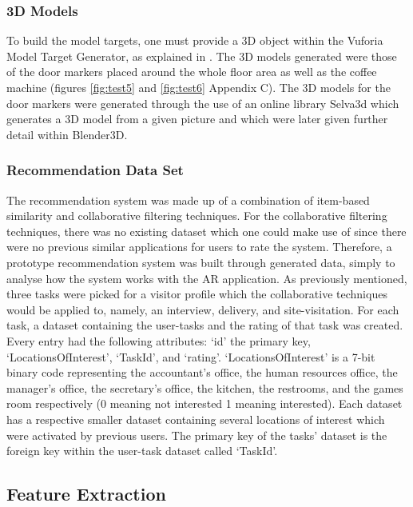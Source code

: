 \documentclass{aifyp}
\begin{document}
\subsubsection{3D Models}
To build the model targets, one must provide a 3D object within the Vuforia Model Target Generator, as explained in \cite{VuforiaUnity}. The 3D models generated were those of the door markers placed around the whole floor area as well as the coffee machine (figures \ref{fig:test5} and \ref{fig:test6} Appendix C). The 3D models for the door markers were generated through the use of an online library Selva3d which generates a 3D model from a given picture and which were later given further detail within Blender3D. 
\subsubsection{Recommendation Data Set}
The recommendation system was made up of a combination of item-based similarity and collaborative filtering techniques. For the collaborative filtering techniques, there was no existing dataset which one could make use of since there were no previous similar applications for users to rate the system. Therefore, a prototype recommendation system was built through generated data, simply to analyse how the system works with the AR application. As previously mentioned, three tasks were picked for a visitor profile which the collaborative techniques would be applied to, namely, an interview, delivery, and site-visitation. For each task, a dataset containing the user-tasks and the rating of that task was created. Every entry had the following attributes: `id' the primary key, `LocationsOfInterest', `TaskId', and `rating'. `LocationsOfInterest' is a 7-bit binary code representing the accountant’s office, the human resources office, the manager’s office, the secretary’s office, the kitchen, the restrooms, and the games room respectively (0 meaning not interested 1 meaning interested). Each dataset has a respective smaller dataset containing several locations of interest which were activated by previous users. The primary key of the tasks’ dataset is the foreign key within the user-task dataset called ‘TaskId’.
\subsection{Feature Extraction}
\end{document}
